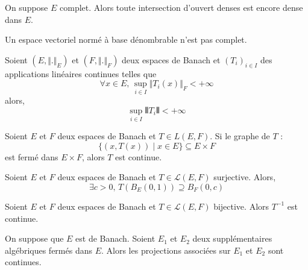 	
	\begin{theorem}[Baire]
		On suppose $E$ complet. Alors toute intersection d'ouvert denses est encore dense dans $E$.
	\end{theorem}
	
	
	\begin{application}
		Un espace vectoriel normé à base dénombrable n'est pas complet.
	\end{application}
	
	
	\begin{application}
		Soient $(E, \Vert . \Vert_E)$ et $(F, \Vert . \Vert_F)$ deux espaces de Banach et $(T_i)_{i \in I}$ des applications linéaires continues telles que
		\[ \forall x \in E, \, \sup_{i \in I} \Vert T_i(x) \Vert_F < +\infty \]
		alors,
		\[ \sup_{i \in I} \VERT T_i \VERT < +\infty \]
	\end{application}
	
	\begin{application}
		Soient $E$ et $F$ deux espaces de Banach et $T \in L(E,F)$. Si le graphe de $T$ :
		\[ \{ (x, T(x)) \mid x \in E \} \subseteq E \times F \]
		est fermé dans $E \times F$, alors $T$ est continue.
	\end{application}
	
	\begin{application}
		Soient $E$ et $F$ deux espaces de Banach et $T \in \mathcal{L}(E,F)$ surjective. Alors,
		\[ \exists c > 0, \, T\left(B_E(0,1)\right) \supseteq B_F(0,c) \]
	\end{application}
	
	\begin{corollary}
		Soient $E$ et $F$ deux espaces de Banach et $T \in \mathcal{L}(E,F)$ bijective. Alors $T^{-1}$ est continue.
	\end{corollary}
	
	\begin{corollary}
		On suppose que $E$ est de Banach. Soient $E_1$ et $E_2$ deux supplémentaires algébriques fermés dans $E$. Alors les projections associées sur $E_1$ et $E_2$ sont continues.
	\end{corollary}

